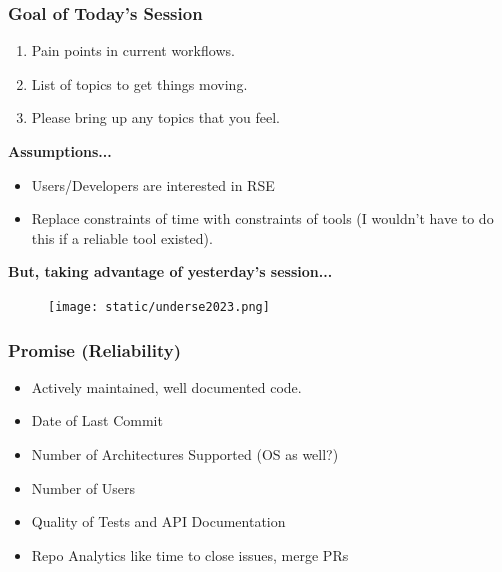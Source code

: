 \documentclass[aspectratio=1610,10pt]{penchbeamer}
\begin{document}
\begin{frame}
  \frametitle{Goal of Today's Session}

  \begin{enumerate}
    \item Pain points in current workflows.
    \item List of topics to get things moving.
    \item Please bring up any topics that you feel.
  \end{enumerate}

  \textbf{Assumptions...}
  \begin{itemize}
    \item Users/Developers are interested in RSE
    \item Replace constraints of time with constraints of tools
      (I wouldn't have to do this if a reliable tool existed).
  \end{itemize}
  \vspace{2ex}

  \textbf{But, taking advantage of yesterday's session...}
\end{frame}


\begin{frame}
  \begin{figure}
    \begin{center}
      \texttt{[image: static/underse2023.png]}
    \end{center}
  \end{figure}
\end{frame}

\begin{frame}
  \frametitle{Promise (Reliability)}

  \begin{itemize}
    \item Actively maintained, well documented code.
    \item Date of Last Commit
    \item Number of Architectures Supported (OS as well?)
    \item Number of Users
    \item Quality of Tests and API Documentation
    \item Repo Analytics like time to close issues, merge PRs
  \end{itemize}
\end{frame}
\end{document}
